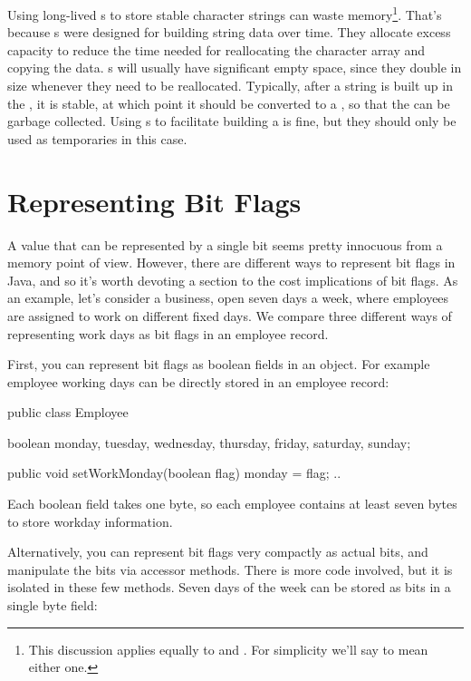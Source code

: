 Using long-lived s to store stable character strings 
can waste memory\footnote{This discussion
applies equally to  and . For
simplicity we'll say  to mean either one.}. That's because
s were designed for building string data over time. They
allocate excess capacity to reduce the time needed for reallocating the
character array and copying the data.  s will usually
have significant empty space, since they double in size whenever they need to be reallocated. 
Typically, after a string is built up in the , it is stable, at which point
it should be converted to a , so that the  can be
garbage collected. Using s to facilitate
building a  is fine, but they should only be used as temporaries
in this case.

\section{Representing Bit Flags}
\label{sec:bit-flags}

A value that can be represented by a single bit seems pretty innocuous from a
memory point of view. However, there are different ways to represent bit flags
in Java, and so it's worth devoting a section to the cost implications of
bit flags. As an example, let's consider a business, open seven days a
week, where employees are assigned to work on different fixed days.  We compare three
different ways of representing work days as bit flags in an employee record.
 
First, you can represent bit flags as boolean fields in an object. For example
employee working days can be directly stored in an employee record:
\begin{shortlisting}

    public class Employee {
    	boolean monday, tuesday, wednesday, thursday, friday, saturday, sunday;
    	
    	public void setWorkMonday(boolean flag) {
    		monday = flag;
    	}
    	..
    }
    
\end{shortlisting}
Each boolean field takes one byte, so each employee contains at least seven
bytes to store workday information. 

Alternatively, you can represent bit flags very compactly as actual bits, and
manipulate the bits via accessor methods. There is more code involved,
but it is isolated in these few methods. Seven days of the week can be stored as
bits in a single byte field:

